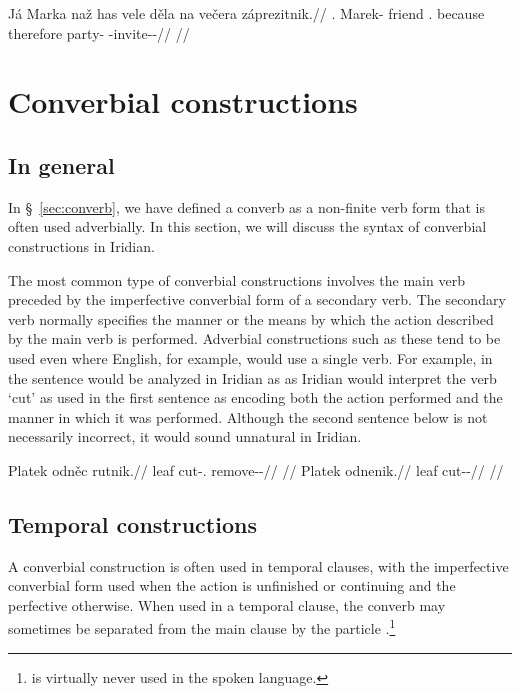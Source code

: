 \pex
\begingl
  \gla Já Marka naž has vele děla na ve\v{c}era záprezitnik.//
  \glb \Second{}\Sg{}.\Str{} Marek-\Acc{} friend \Cop.\Neg{} because therefore \Loc{} party-\Acc{} \Neg{}-invite-\Pv{}-\Pf{}//
  \glft {}//
\endgl
\xe




\section{Converbial constructions}\label{converbs-syntax}

\subsection{In general}

In \S~\ref{sec:converb}, we have defined a converb as a non-finite verb form
that is often used adverbially. In this section, we will discuss the syntax of
converbial constructions in Iridian.

The most common type of converbial constructions involves the main verb preceded
by the imperfective converbial form of a secondary verb. The secondary verb
normally specifies the manner or the means by which the action described by the
main verb is performed. Adverbial constructions such as these tend to be used
even where English, for example, would use a single verb. For example, in the
sentence  would be analyzed in Iridian as  as Iridian would interpret the verb `cut' as used
in the first sentence as encoding both the action performed and the manner in
which it was performed. Although the second sentence below is not necessarily
incorrect, it would sound unnatural in Iridian.

\pex
\a\begingl
  \gla Platek odněc rutnik.//
  \glb leaf cut-\Cv{}.\Ipf{} remove-\Pv{}-\Pf{}//
  \glft {}//
\endgl
\a\begingl
  \gla{}Platek odnenik.//
  \glb leaf cut-\Pv{}-\Pf{}//
  \glft {}//
\endgl
\xe



\subsection{Temporal constructions}

A converbial construction is often used in temporal clauses, with the imperfective converbial form used when the action is
unfinished or continuing and the perfective otherwise. When used in a temporal
clause, the converb may sometimes be separated from the main clause by the
particle .\footnote{ is virtually never used in the spoken
language.}

